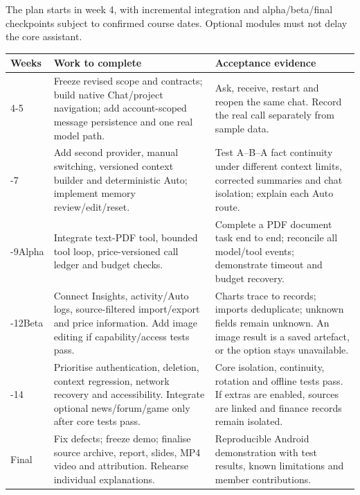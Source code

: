 \documentclass[10pt,a4paper]{article}
\newcommand{\sect}[2]{\par\vspace{6pt}{\sffamily\bfseries\fontsize{12.5}{15}\selectfont\color{ink}#1\enspace #2}\par\vspace{2pt}}
\newcommand{\tablehead}[1]{\rowcolor{pale}\sffamily\bfseries #1}
\begin{document}
\newpage
\sect{8}{Development timeline: course weeks 4-15}
The plan starts in week 4, with incremental integration and alpha/beta/final checkpoints subject to confirmed course dates. Optional modules must not delay the core assistant.

{\fontsize{9.6}{11.8}\selectfont
\begin{tabularx}{\linewidth}{@{}L{16mm}Y L{60mm}@{}}
\toprule
\tablehead{Weeks} & \sffamily\bfseries Work to complete & \sffamily\bfseries Acceptance evidence \\
-5 & Freeze revised scope and contracts; build native Chat/project navigation; add account-scoped message persistence and one real model path. & Ask, receive, restart and reopen the same chat. Record the real call separately from sample data. \\
-7 & Add second provider, manual switching, versioned context builder and deterministic Auto; implement memory review/edit/reset. & Test A--B--A fact continuity under different context limits, corrected summaries and chat isolation; explain each Auto route. \\
-9\newline Alpha & Integrate text-PDF tool, bounded tool loop, price-versioned call ledger and budget checks. & Complete a PDF document task end to end; reconcile all model/tool events; demonstrate timeout and budget recovery. \\
-12\newline Beta & Connect Insights, activity/Auto logs, source-filtered import/export and price information. Add image editing if capability/access tests pass. & Charts trace to records; imports deduplicate; unknown fields remain unknown. An image result is a saved artefact, or the option stays unavailable. \\
-14 & Prioritise authentication, deletion, context regression, network recovery and accessibility. Integrate optional news/forum/game only after core tests pass. & Core isolation, continuity, rotation and offline tests pass. If extras are enabled, sources are linked and finance records remain isolated. \\
\newline Final & Fix defects; freeze demo; finalise source archive, report, slides, MP4 video and attribution. Rehearse individual explanations. & Reproducible Android demonstration with test results, known limitations and member contributions. \\
\bottomrule
\end{tabularx}}
\end{document}
